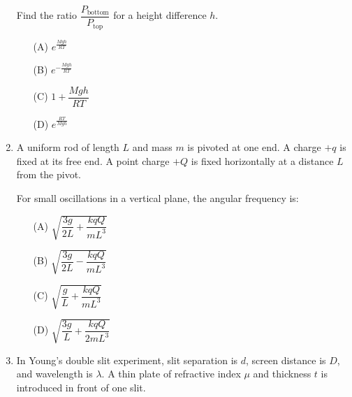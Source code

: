 \documentclass[12pt]{article}
\begin{document}
\begin{enumerate}[leftmargin=0pt,itemindent=0pt]
Find the ratio $\dfrac{P_{\text{bottom}}}{P_{\text{top}}}$ for a height difference $h$.

\begin{enumerate}
\item[(A)] $e^{\frac{Mg h}{RT}}$
\item[(B)] $e^{-\frac{Mg h}{RT}}$
\item[(C)] $1+\dfrac{Mg h}{RT}$
\item[(D)] $e^{\frac{RT}{Mg h}}$
\end{enumerate}


\item A uniform rod of length $L$ and mass $m$ is pivoted at one end. A charge $+q$ is fixed at its free end. A point charge $+Q$ is fixed horizontally at a distance $L$ from the pivot.

For small oscillations in a vertical plane, the angular frequency is:

\begin{center}
\end{center}

\begin{enumerate}
\item[(A)] $\sqrt{\dfrac{3g}{2L}+\dfrac{kqQ}{mL^3}}$
\item[(B)] $\sqrt{\dfrac{3g}{2L}-\dfrac{kqQ}{mL^3}}$
\item[(C)] $\sqrt{\dfrac{g}{L}+\dfrac{kqQ}{mL^3}}$
\item[(D)] $\sqrt{\dfrac{3g}{L}+\dfrac{kqQ}{2mL^3}}$
\end{enumerate}


\item In Young’s double slit experiment, slit separation is $d$, screen distance is $D$, and wavelength is $\lambda$. A thin plate of refractive index $\mu$ and thickness $t$ is introduced in front of one slit.


\end{enumerate}
\end{document}
